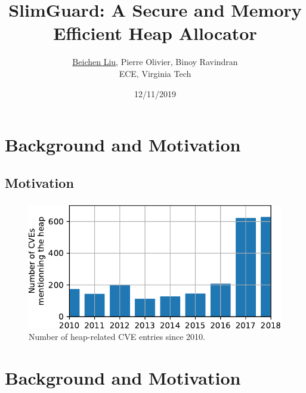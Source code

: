 \documentclass{beamer}
\title{\textbf{SlimGuard: A Secure and  Memory Efficient Heap Allocator}}
\date{12/11/2019}
\author{\underline{Beichen Liu},  Pierre Olivier,  Binoy Ravindran\\
\small ECE, Virginia Tech}
\begin{document}
\begin{frame}
\titlepage
\end{frame}

\section{Background and Motivation}
\subsection{Motivation}
\begin{frame}
		\frametitle{\secname}
    \framesubtitle{\subsecname}
    \begin{figure}
      \centering
      \includegraphics{CVE.pdf}
      \\Number of heap-related CVE entries since 2010.

    \end{figure}
\end{frame}


\section{Background and Motivation}
\end{document}
